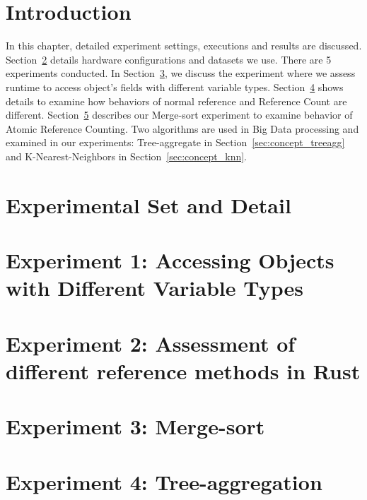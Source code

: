 \section{Introduction}
\label{sec:eval_intro}
In this chapter, detailed experiment settings, executions and results are discussed.
Section~\ref{sec:eval_setdetail} details hardware configurations and datasets we use. 
There are 5 experiments conducted. In Section~\ref{sec:eval_diffval}, we discuss the experiment 
where we assess runtime to access object's fields with different variable types. 
Section~\ref{sec:eval_refcount} shows details to examine how behaviors of normal reference and Reference Count are different. 
Section~\ref{sec:eval_sort} describes our Merge-sort experiment to examine behavior of Atomic Reference Counting.
Two algorithms are used in Big Data processing and examined in our experiments: 
Tree-aggregate in Section~\ref{sec:concept_treeagg} and K-Nearest-Neighbors in Section~\ref{sec:concept_knn}.

\section{Experimental Set and Detail}
\label{sec:eval_setdetail}


\section{Experiment 1: Accessing Objects with Different Variable Types}
\label{sec:eval_diffval}


\section{Experiment 2: Assessment of different reference methods in Rust}
\label{sec:eval_refcount}


\section{Experiment 3: Merge-sort}
\label{sec:eval_sort}



\section{Experiment 4: Tree-aggregation}
\label{sec:eval_treeagg}


